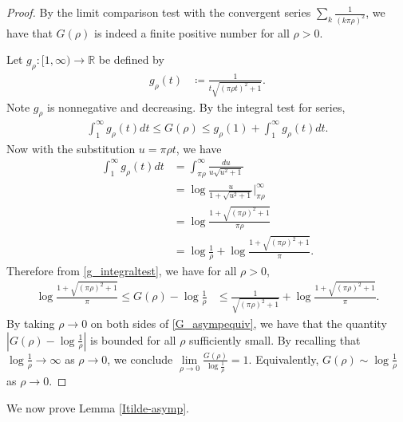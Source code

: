 \documentclass{amsart}
\theoremstyle{plain}
\numberwithin{theorem}{section}
\theoremstyle{definition}
\theoremstyle{remark}
\theoremstyle{brakets}
\newcommand{\R}{\mathbb{R}}
\begin{document}
\begin{proof}
By the limit comparison test with the convergent series $\sum\limits_{k} \frac{1}{(k\pi\rho)^2}$, we have that $G(\rho)$ is indeed a finite positive number for all $\rho > 0$.

Let $g_\rho: [1,\infty) \to \R$ be defined by
\begin{align*}
    g_\rho(t) &\coloneq \frac{1}{t\sqrt{(\pi\rho t)^2 + 1}}.
\end{align*}
Note $g_\rho$ is nonnegative and decreasing. By the integral test for series,
\begin{align}\label{g_integraltest}
    \int_1^{\infty} g_\rho(t)dt \leq G(\rho) \leq g_\rho(1) + \int_1^{\infty}g_\rho(t)dt.
\end{align}
Now with the substitution $u = \pi \rho t$, we have
\begin{align*}
    \int_1^{\infty} g_\rho(t)dt &= \int_{\pi\rho}^{\infty} \frac{du}{u\sqrt{u^2 + 1}} \\
    &= \log \frac{u}{1 + \sqrt{u^2 + 1}} \bigg\rvert^{\infty}_{\pi\rho} \\
    &= \log \frac{1 + \sqrt{(\pi\rho)^2+1}}{\pi\rho} \\
    &= \log \frac{1}{\rho} + \log \frac{1+\sqrt{(\pi\rho)^2 + 1}}{\pi}.
\end{align*}
Therefore from \ref{g_integraltest}, we have for all $\rho > 0$,
\begin{align}\label{G_asympequiv}
    \log \frac{1+\sqrt{(\pi\rho)^2 + 1}}{\pi} \leq G(\rho) - \log \frac{1}{\rho} &\leq \frac{1}{\sqrt{(\pi\rho)^2 + 1}} + \log \frac{1+\sqrt{(\pi\rho)^2 + 1}}{\pi}.
\end{align}
By taking $\rho \to 0$ on both sides of \ref{G_asympequiv}, we have that the quantity $|G(\rho) - \log\frac{1}{\rho}|$ is bounded for all $\rho$ sufficiently small. By recalling that $\log \frac{1}{\rho} \to \infty$ as $\rho \to 0$, we conclude $\lim\limits_{\rho \to 0} \frac{G(\rho)}{\log \frac{1}{\rho}} = 1$. Equivalently, $G(\rho) \sim \log \frac{1}{\rho}$ as $\rho \to 0$.

    
\end{proof}

We now prove Lemma \ref{Itilde-asymp}.
\end{document}
